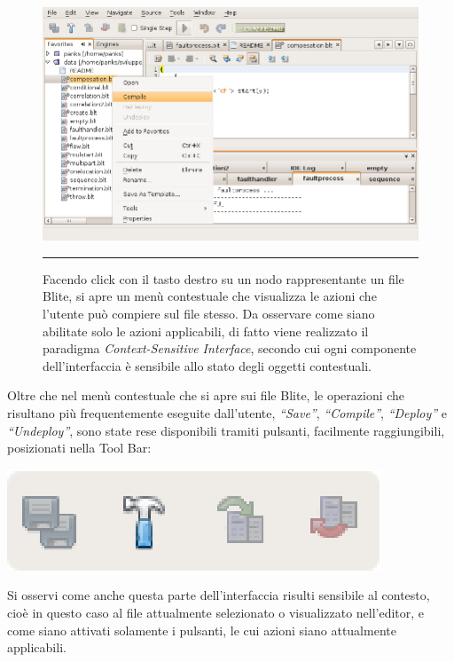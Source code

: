 \begin{figure}[t]
\begin{center}
\includegraphics[scale=0.70]
{blide/dia/BlideCMenu}
\caption[Menu Contestuale su di un File Blite]{Facendo click con il tasto destro
su un nodo rappresentante un file Blite, si apre un menù contestuale che
visualizza le azioni che l'utente può compiere sul file stesso. Da osservare
come siano abilitate solo le azioni applicabili, di fatto viene realizzato il
paradigma \emph{Context-Sensitive Interface}, secondo cui ogni componente
dell'interfaccia è sensibile allo stato degli oggetti contestuali.}
\rule{7cm}{0.01cm}
  \label{fig:blideCMenu}
\end{center}
\end{figure}

Oltre che nel menù contestuale che si apre sui file Blite, le operazioni che
risultano più frequentemente eseguite dall'utente, \emph{``Save''},
\emph{``Compile''}, \emph{``Deploy''} e \emph{``Undeploy''}, sono state rese
disponibili tramiti pulsanti, facilmente raggiungibili, posizionati nella Tool
Bar:

\begin{center}
\includegraphics[scale=0.70]
{blide/dia/BlideFileToolBar}
\end{center}

Si osservi come anche questa parte dell'interfaccia risulti sensibile al
contesto, cioè in questo caso al file attualmente selezionato o visualizzato
nell'editor, e come siano attivati solamente i pulsanti, le cui azioni siano
attualmente applicabili. 

